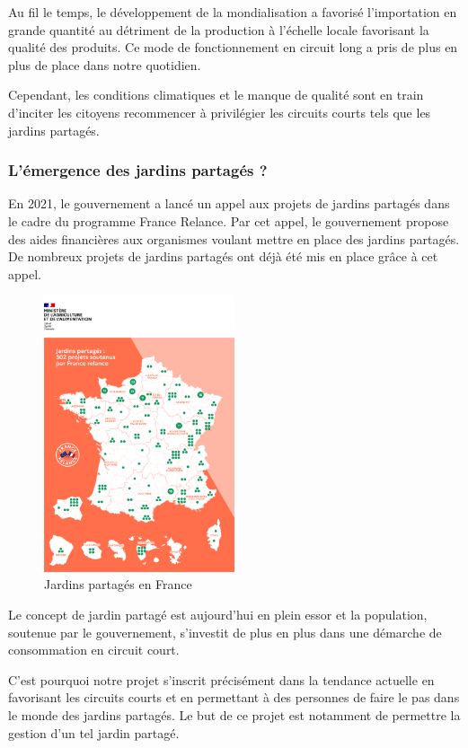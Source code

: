 \documentclass[french,a4paper]{article}
\begin{document}
Au fil le temps, le développement de la mondialisation a favorisé l’importation en grande quantité au détriment de la production à l’échelle locale favorisant la qualité des produits. Ce mode de fonctionnement en circuit long a pris de plus en plus de place dans notre quotidien. 

Cependant, les conditions climatiques et le manque de qualité sont en train d'inciter les citoyens recommencer à privilégier les circuits courts tels que les jardins partagés.

\subsubsection{L'émergence des jardins partagés ?}

En 2021, le gouvernement a lancé un appel aux projets de jardins partagés dans le cadre du programme France Relance. Par cet appel, le gouvernement propose des aides financières aux organismes voulant mettre en place des jardins partagés. De nombreux projets de jardins partagés ont déjà été mis en place grâce à cet appel.
\begin{figure}[H]
    \centering
    \includegraphics[width=0.5\textwidth]{img/francerelance_carte.png}
    \caption{Jardins partagés en France}
\end{figure}
Le concept de jardin partagé est aujourd’hui en plein essor et la population, soutenue par le gouvernement, s’investit de plus en plus dans une démarche de consommation en circuit court. 

C’est pourquoi notre projet s’inscrit précisément dans la tendance actuelle en favorisant les circuits courts et en permettant à des personnes de faire le pas dans le monde des jardins partagés. Le but de ce projet est notamment de  permettre la gestion d’un tel jardin partagé.
\end{document}
